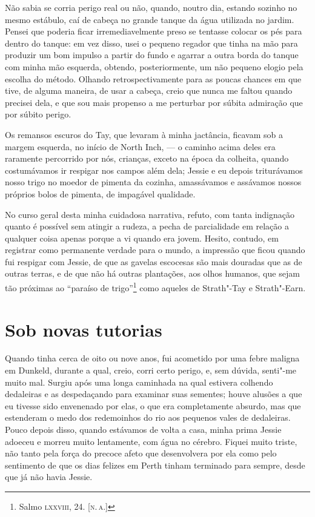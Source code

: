 Não sabia se corria perigo real ou não, quando, noutro dia, estando
sozinho no mesmo estábulo, caí de cabeça no grande tanque da água
utilizada no jardim. Pensei que poderia ficar irremediavelmente preso se
tentasse colocar os pés para dentro do tanque: em vez disso, usei o
pequeno regador que tinha na mão para produzir um bom impulso a partir
do fundo e agarrar a outra borda do tanque com minha mão esquerda,
obtendo, posteriormente, um não pequeno elogio pela escolha do método.
Olhando retrospectivamente para as poucas chances em que tive, de alguma
maneira, de usar a cabeça, creio que nunca me faltou quando precisei
dela, e que sou mais propenso a me perturbar por súbita admiração que
por súbito perigo.

Os remansos escuros do Tay, que levaram à minha jactância, ficavam
sob a margem esquerda, no início de North Inch, --- o caminho acima deles
era raramente percorrido por nós, crianças, exceto na época da colheita,
quando costumávamos ir respigar nos campos além dela; Jessie e eu depois
triturávamos nosso trigo no moedor de pimenta da cozinha, amassávamos e
assávamos nossos próprios bolos de pimenta, de impagável qualidade.

No curso geral desta minha cuidadosa narrativa, refuto, com tanta
indignação quanto é possível sem atingir a rudeza, a pecha de
parcialidade em relação a qualquer coisa apenas porque a vi quando era
jovem. Hesito, contudo, em registrar como permanente verdade para o
mundo, a impressão que ficou quando fui respigar com Jessie, de que as
gavelas escocesas são mais douradas que as de outras terras, e de que
não há outras plantações, aos olhos humanos, que sejam tão próximas ao
``paraíso de trigo''\footnote{Salmo \textsc{lxxviii}, 24. {[}\textsc{n.\,a.}{]}} como
aqueles de Strath"-Tay e Strath"-Earn.

\chapter{Sob novas tutorias} %

Quando tinha cerca de oito ou nove anos, fui acometido por uma febre
maligna em Dunkeld, durante a qual, creio, corri certo perigo, e, sem
dúvida, senti"-me muito mal. Surgiu após uma longa caminhada na qual
estivera colhendo dedaleiras e as despedaçando para examinar suas
sementes; houve alusões a que eu tivesse sido envenenado por elas, o que
era completamente absurdo, mas que estenderam o medo dos redemoinhos do
rio aos pequenos vales de dedaleiras. Pouco depois disso, quando
estávamos de volta a casa, minha prima Jessie adoeceu e morreu muito \label{jessie}
lentamente, com água no cérebro. Fiquei muito triste, não tanto pela
força do precoce afeto que desenvolvera por ela como pelo sentimento de
que os dias felizes em Perth tinham terminado para sempre, desde que já
não havia Jessie.

